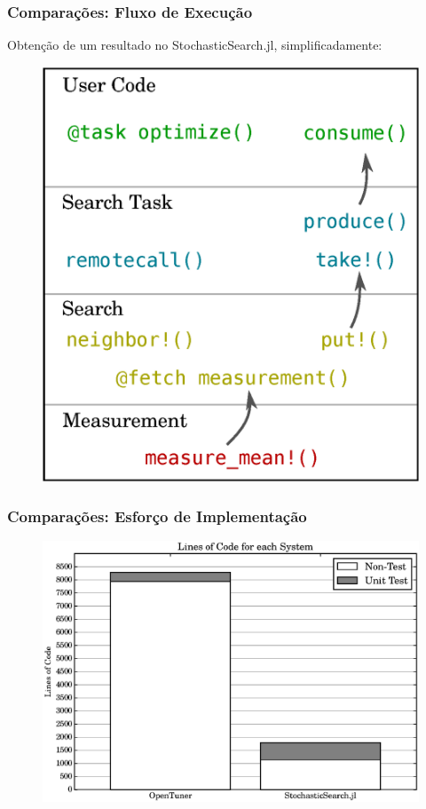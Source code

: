 \documentclass[10pt, compress]{beamer}
\begin{document}
\begin{frame}[fragile]
    \frametitle{Comparações: Fluxo de Execução}
    Obtenção de um resultado no StochasticSearch.jl, simplificadamente:
    \begin{figure}[H]
        \centering
        \includegraphics[width=.55\textwidth]{stochasticsearchflow_simple}
    \end{figure}%
\end{frame}


\begin{frame}[fragile]
    \frametitle{Comparações: Esforço de Implementação}
    \begin{figure}[H]
        \centering
        \includegraphics[width=1\textwidth]{loc_comparison}
    \end{figure}%
\end{frame}
\end{document}
